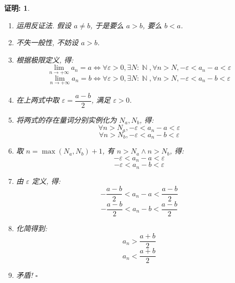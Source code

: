 \documentclass[UTF8]{ctexart}
\DeclareMathOperator{\N}{\mathbb{N}}                    %
\DeclareMathOperator{\0}{\mathbf{0}}                    %
\newcommand{\<}{\langle}
\renewcommand{\>}{\rangle}                              %
\newenvironment{prf_box}{
    \begin{tcolorbox}[enhanced, colback=prf_grey2, boxrule=0pt, frame hidden,
        borderline west={0.7mm}{0.1mm}{prf_grey1},breakable]
    }
    {\end{tcolorbox}}
\theoremstyle{MyStyle} %
\newtheorem*{myproof}{证明: \newline}
\newenvironment{prf}{\begin{prf_box}\begin{myproof}}{\end{myproof}\end{prf_box}}
\begin{document}
        \begin{prf}
            \begin{enumerate}
                \item 运用反证法. 假设 $a\neq b$, 于是要么 $a>b$, 要么 $b<a$. 
                \item 不失一般性, 不妨设 $a>b$. 
                \item 根据极限定义, 得: 
                \[\lim_{n\to+\infty}a_n = a\iff\forall\varepsilon>0, \exists N:\N, \forall n>N, -\varepsilon<a_n-a<\varepsilon\]
                \[\lim_{n\to+\infty}a_n = b\iff\forall\varepsilon>0, \exists N:\N, \forall n>N, -\varepsilon<a_n-b<\varepsilon\]
                \item 在上两式中取 $\varepsilon = \dfrac{a-b}{2}$, 满足 $\varepsilon>0$. 
                \item 将两式的存在量词分别实例化为 $N_a,N_b$, 得: 
                \[\forall n>N_a, -\varepsilon<a_n-a<\varepsilon\]
                \[\forall n>N_b, -\varepsilon<a_n-b<\varepsilon\]
                \item 取 $n=\max(N_a,N_b)+1$, 有 $n>N_a\land n>N_b$, 得: 
                \[-\varepsilon<a_n-a<\varepsilon\]
                \[-\varepsilon<a_n-b<\varepsilon\]
                \item 由 $\varepsilon$ 定义, 得: 
                \[-\frac{a-b}{2}<a_n-a<\frac{a-b}{2}\]
                \[-\frac{a-b}{2}<a_n-b<\frac{a-b}{2}\]
                \item 化简得到: 
                \[a_n>\frac{a+b}{2}\]
                \[a_n<\frac{a+b}{2}\]
                \item 矛盾! 
                $\square$
            \end{enumerate}
        \end{prf}
\end{document}

